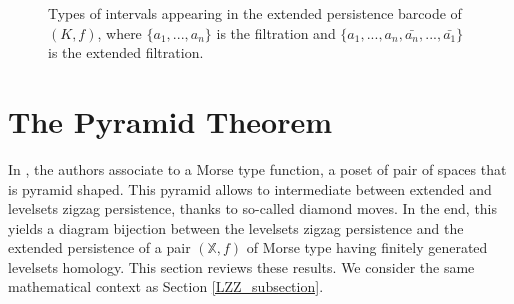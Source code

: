 \documentclass[11pt]{article}
\theoremstyle{remark}
\newcommand{\X}{\mathbb{X}}
\begin{document}
\begin{figure}







    \caption{Types of intervals appearing in the extended persistence barcode of $(K,f)$, where $\{a_1,...,a_n\}$ is the filtration and $\{a_1,...,a_n,\bar{a_n},...,\bar{a_1}\}$ is the extended filtration.}
    \label{fig:interval_types}
\end{figure}








\section{The Pyramid Theorem}
\label{pyr1}

In \cite{10.1145/1542362.1542408}, the authors associate to a Morse type function, a poset of pair of spaces that is pyramid shaped. This pyramid allows to intermediate between extended and levelsets zigzag persistence, thanks to so-called diamond moves. In the end, this yields a diagram bijection between the levelsets zigzag persistence and the extended persistence of a pair $(\X,f)$ of Morse type having finitely generated levelsets homology.  This section reviews these results. We consider the same mathematical context as Section \ref{LZZ_subsection}.
\end{document}
